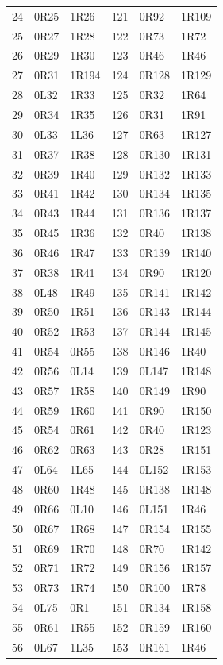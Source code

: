 \begin{longtable}{rll@{\qquad}rll}
24 & 0R25 & 1R26 & 121 & 0R92 & 1R109\\
25 & 0R27 & 1R28 & 122 & 0R73 & 1R72\\
26 & 0R29 & 1R30 & 123 & 0R46 & 1R46\\
27 & 0R31 & 1R194 & 124 & 0R128 & 1R129\\
28 & 0L32 & 1R33 & 125 & 0R32 & 1R64\\
29 & 0R34 & 1R35 & 126 & 0R31 & 1R91\\
30 & 0L33 & 1L36 & 127 & 0R63 & 1R127\\
31 & 0R37 & 1R38 & 128 & 0R130 & 1R131\\
32 & 0R39 & 1R40 & 129 & 0R132 & 1R133\\
33 & 0R41 & 1R42 & 130 & 0R134 & 1R135\\
34 & 0R43 & 1R44 & 131 & 0R136 & 1R137\\
35 & 0R45 & 1R36 & 132 & 0R40 & 1R138\\
36 & 0R46 & 1R47 & 133 & 0R139 & 1R140\\
37 & 0R38 & 1R41 & 134 & 0R90 & 1R120\\
38 & 0L48 & 1R49 & 135 & 0R141 & 1R142\\
39 & 0R50 & 1R51 & 136 & 0R143 & 1R144\\
40 & 0R52 & 1R53 & 137 & 0R144 & 1R145\\
41 & 0R54 & 0R55 & 138 & 0R146 & 1R40\\
42 & 0R56 & 0L14 & 139 & 0L147 & 1R148\\
43 & 0R57 & 1R58 & 140 & 0R149 & 1R90\\
44 & 0R59 & 1R60 & 141 & 0R90 & 1R150\\
45 & 0R54 & 0R61 & 142 & 0R40 & 1R123\\
46 & 0R62 & 0R63 & 143 & 0R28 & 1R151\\
47 & 0L64 & 1L65 & 144 & 0L152 & 1R153\\
48 & 0R60 & 1R48 & 145 & 0R138 & 1R148\\
49 & 0R66 & 0L10 & 146 & 0L151 & 1R46\\
50 & 0R67 & 1R68 & 147 & 0R154 & 1R155\\
51 & 0R69 & 1R70 & 148 & 0R70 & 1R142\\
52 & 0R71 & 1R72 & 149 & 0R156 & 1R157\\
53 & 0R73 & 1R74 & 150 & 0R100 & 1R78\\
54 & 0L75 & 0R1 & 151 & 0R134 & 1R158\\
55 & 0R61 & 1R55 & 152 & 0R159 & 1R160\\
56 & 0L67 & 1L35 & 153 & 0R161 & 1R46\\

\end{longtable}
